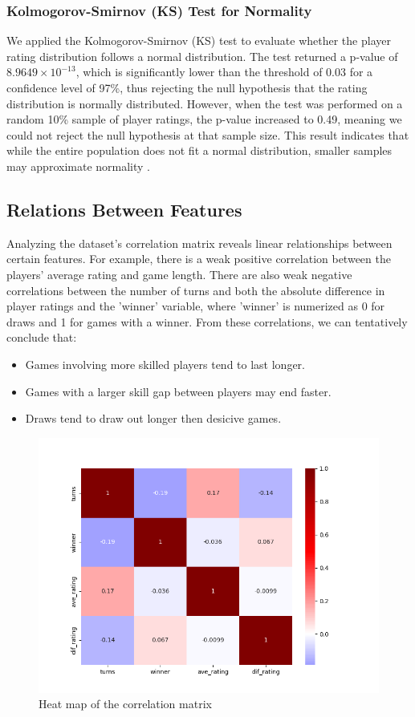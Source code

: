 \documentclass[conference]{IEEEtran}
\begin{document}
\subsubsection*{Kolmogorov-Smirnov (KS) Test for Normality}
We applied the Kolmogorov-Smirnov (KS) test to evaluate whether the player rating distribution follows a normal distribution. The test returned a p-value of \(8.9649 \times 10^{-13}\), which is significantly lower than the threshold of \(0.03\) for a confidence level of 97\%, thus rejecting the null hypothesis that the rating distribution is normally distributed. However, when the test was performed on a random 10\% sample of player ratings, the p-value increased to 0.49, meaning we could not reject the null hypothesis at that sample size. This result indicates that while the entire population does not fit a normal distribution, smaller samples may approximate normality \cite{kssample}.


\subsection{Relations Between Features}
Analyzing the dataset’s correlation matrix reveals linear relationships between certain features. For example, there is a weak positive correlation between the players' average rating and game length. There are also weak negative correlations between the number of turns and both the absolute difference in player ratings and the 'winner' variable, where 'winner' is numerized as 0 for draws and 1 for games with a winner. From these correlations, we can tentatively conclude that:
\begin{itemize}
    \item Games involving more skilled players tend to last longer.
 
    \item Games with a larger skill gap between players may end faster.

    \item Draws tend to draw out longer then desicive games.
\end{itemize}

\begin{figure}[H]
    \centering
    \includegraphics[width=0.8\linewidth]{corr_mat.png}
    \caption{Heat map of the correlation matrix}
    \label{fig:corr_mat}
\end{figure}
\end{document}
